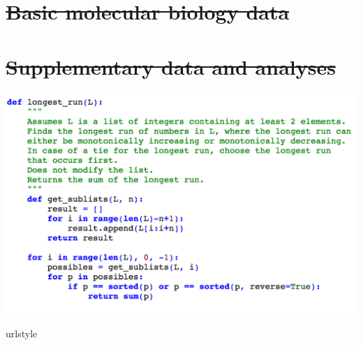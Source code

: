 \documentclass[12pt,twoside]{mitthesis}
\providecommand{\DIFdeltex}[1]{{\protect\color{red}\sout{#1}}}                      %
\providecommand{\DIFaddbegin}{} %
\providecommand{\DIFaddend}{} %
\providecommand{\DIFdelbegin}{} %
\providecommand{\DIFdelend}{} %
\providecommand{\DIFdel}[1]{\texorpdfstring{\DIFdeltex{#1}}{}} %
\begin{document}
{{{{{{{{{{\begin{itemize}
\DIFdelbegin \section{\DIFdel{Basic molecular biology data}}
\addtocounter{section}{-1}%


\section{\DIFdel{Supplementary data and analyses}}
\addtocounter{section}{-1}%

\DIFdelend \DIFaddbegin \includegraphics[scale=0.65]{Body/figures/grovercode/fig_longest_run}
 \end{itemize} 
\DIFaddend %
%
%


\clearpage
\DIFdelbegin %
\DIFdelend \DIFaddbegin \begin{thebibliography}{135}
\DIFaddend \providecommand{\natexlab}[1]{#1}
\providecommand{\url}[1]{\texttt{#1}}
\expandafter\ifx\csname urlstyle\endcsname\relax
  \providecommand{\doi}[1]{doi: #1}\else
  \providecommand{\doi}{doi: \begingroup \urlstyle{rm}\Url}\fi


\end{thebibliography}}}}}}}}}}}
\end{document}
